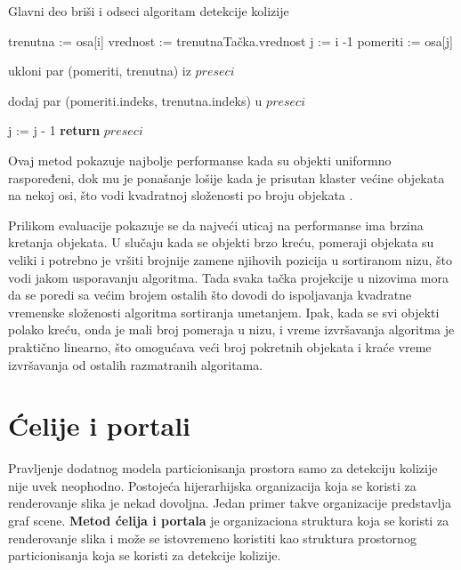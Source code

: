 \documentclass[12pt,oneside]{memoir}
\begin{document}
\begin{algorithm}
	\caption{Glavni deo briši i odseci algoritam detekcije kolizije}
    \label{alg:SAP}
	\begin{algorithmic}[1]
			\State trenutna :=  osa[i]
			\State vrednost := trenutnaTačka.vrednost
			\State j := i -1
				\State pomeriti := osa[j]


					\State ukloni par (pomeriti, trenutna) iz $preseci$
				\EndIf		

						\State dodaj par (pomeriti.indeks, trenutna.indeks) u $preseci$
					\EndIf		
				\EndIf

				\State j := j - 1
			\EndWhile
		\EndFor
		\State \textbf{return} $preseci$
		\EndProcedure
    \end{algorithmic}
\end{algorithm}

Ovaj metod pokazuje najbolje performanse kada su objekti uniformno raspoređeni, dok mu je ponašanje lošije kada je
prisutan klaster većine objekata na nekoj osi, što vodi kvadratnoj složenosti po broju objekata \cite{glavna2}.

Prilikom evaluacije pokazuje se da najveći uticaj na performanse ima brzina kretanja objekata.
U slučaju kada se objekti brzo kreću, pomeraji objekata su veliki i potrebno je vršiti brojnije zamene njihovih pozicija u sortiranom nizu,
što vodi jakom usporavanju algoritma.
Tada svaka tačka projekcije u nizovima mora 
da se poredi sa većim brojem ostalih što dovodi do ispoljavanja kvadratne vremenske složenosti algoritma sortiranja umetanjem.
Ipak, kada se svi objekti polako kreću, onda je mali broj pomeraja u nizu, i vreme izvršavanja algoritma je praktično 
linearno, što omogućava veći broj pokretnih objekata i kraće vreme izvršavanja od ostalih razmatranih algoritama.

\section{Ćelije i portali}
\label{subsec:cells}

Pravljenje dodatnog modela particionisanja prostora samo za detekciju kolizije nije uvek neophodno.
Postojeća hijerarhijska organizacija koja se koristi za renderovanje slika je nekad dovoljna.
Jedan primer takve organizacije predstavlja graf scene.
\textbf{Metod ćelija i portala}  je organizaciona struktura koja se koristi za renderovanje slika
i može se istovremeno koristiti kao struktura prostornog particionisanja koja se koristi za detekcije kolizije.
\end{document}
